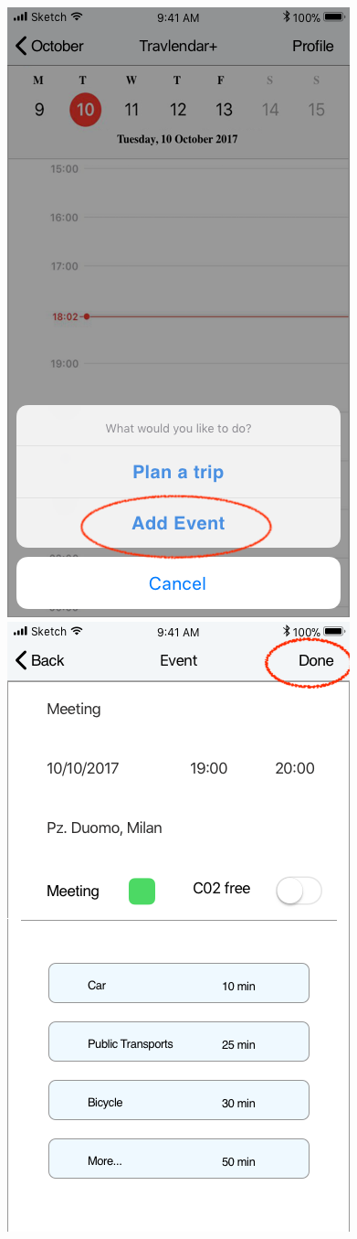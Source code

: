 \begin{figure}[H]
	\includegraphics[scale=0.23]{Images/Interface/Calendar/2_add_menu}
	\hspace{0.5cm}
	\includegraphics[scale=0.23]{Images/Interface/Calendar/3_single_event_view}

\end{figure}
